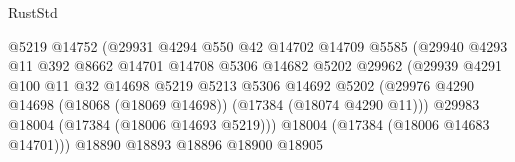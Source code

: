 \begin{lexlean}{RustStd}
\begin{coremodule}
                                            @5219
                                            @14752
                                            (@29931
                                              @4294
                                              @550
                                              @42
                                              @14702
                                              @14709
                                              @5585
                                              (@29940
                                                @4293
                                                @11
                                                @392
                                                @8662
                                                @14701
                                                @14708
                                                @5306
                                                @14682
                                                @5202
                                                @29962
                                                (@29939
                                                  @4291
                                                  @100
                                                  @11
                                                  @32
                                                  @14698
                                                  @5219
                                                  @5213
                                                  @5306
                                                  @14692
                                                  @5202
                                                  (@29976
                                                    @4290
                                                    @14698
                                                    (@18068 (@18069 @14698))
                                                    (@17384 (@18074 @4290 @11)))
                                                  @29983
                                                  @18004
                                                  (@17384 (@18006 @14693 @5219)))
                                                @18004
                                                (@17384 (@18006 @14683 @14701)))
                                              @18890
                                              @18893
                                              @18896
                                              @18900
                                              @18905

\end{coremodule}
\end{lexlean}
